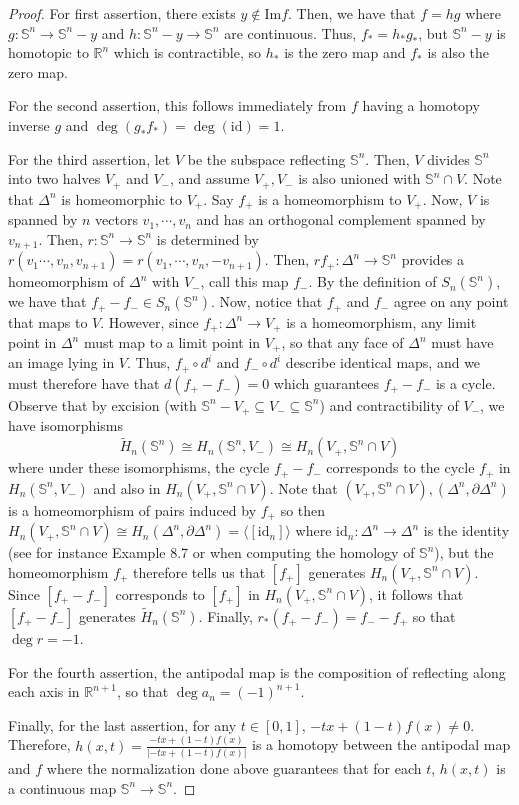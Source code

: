 \documentclass[12pt,reqno]{amsart}
\numberwithin{theorem}{section}
\theoremstyle{definition}
\theoremstyle{remark}
\numberwithin{equation}{section}
\renewcommand{\S}{\mathbb S}
\renewcommand{\Im}{\text{Im}}
\newcommand{\del}{\partial}
\theoremstyle{definition}
\newcommand{\R}{\mathbb{R}}
\newcommand{\id}{\mathrm{id}}
\begin{document}
\begin{proof}
    For first assertion, there exists $y \notin \Im f$. Then, we have that $f = hg$ where $g:\S^n \rightarrow \S^n - y$ and $h:\S^n - y \rightarrow \S^n$ are continuous. Thus, $f_*=h_*g_*$, but $\S^n-y$ is homotopic to $\R^n$ which is contractible, so $h_*$ is the zero map and $f_*$ is also the zero map.

    For the second assertion, this follows immediately from $f$ having a homotopy inverse $g$ and $\deg (g_*f_*) = \deg(\id) = 1$.

    For the third assertion, let $V$ be the subspace reflecting $\S^n$. Then, $V$ divides $\S^n$ into two halves $V_+$ and $V_-$, and assume $V_+,V_-$ is also unioned with $\S^n \cap V$. Note that $\Delta^n$ is homeomorphic to $V_+$. Say $f_+$ is a homeomorphism to $V_+$. Now, $V$ is spanned by $n$ vectors $v_1,\cdots, v_n$ and has an orthogonal complement spanned by $v_{n+1}$. Then, $r:\S^n\rightarrow \S^n$ is determined by $r(v_1\cdots, v_n,v_{n+1}) = r(v_1,\cdots,v_n,-v_{n+1})$. Then, $rf_+ : \Delta^n \rightarrow \S^n$ provides a homeomorphism of $\Delta^n$ with $V_-$, call this map $f_-$. By the definition of $S_n(\S^n)$, we have that $f_+-f_- \in S_n(\S^n)$. Now, notice that $f_+$ and $f_-$ agree on any point that maps to $V$. However, since $f_+:\Delta^n \rightarrow V_+$ is a homeomorphism, any limit point in $\Delta^n$ must map to a limit point in $V_+$, so that any face of $\Delta^n$ must have an image lying in $V$. Thus, $f_+\circ d^i$ and $f_-\circ d^i$ describe identical maps, and we must therefore have that $d(f_+-f_-) = 0$ which guarantees $f_+-f_-$ is a cycle. Observe that by excision (with $\S^n - V_+ \subseteq V_- \subseteq \S^n$) and contractibility of $V_-$, we have isomorphisms 
    $$\tilde H_n(\S^n) \cong H_n(\S^n,V_-) \cong H_n(V_+,\S^n \cap V) $$
    where under these isomorphisms, the cycle $f_+ - f_-$ corresponds to the cycle $f_+$ in $H_n(\S^n,V_-)$ and also in $H_n(V_+,\S^n \cap V)$. Note that $(V_+,\S^n \cap V), (\Delta^n ,\del \Delta^n)$ is a homeomorphism of pairs induced by $f_+$ so then $H_n(V_+,\S^n \cap V) \cong H_n(\Delta^n ,\del \Delta^n) = \langle [\id_n]\rangle $ where $\id_n:\Delta^n \rightarrow \Delta^n$ is the identity (see for instance \cite{miller} Example 8.7 or \cite{hatcher} when computing the homology of $\S^n$), but the homeomorphism $f_+$ therefore tells us that $[f_+]$ generates $H_n(V_+,\S^n \cap V)$. Since $[f_+-f_-]$ corresponds to $[f_+]$ in $H_n(V_+,\S^n \cap V)$, it follows that $[f_+-f_-]$ generates $\tilde H_n(\S^n)$. Finally, $r_*(f_+-f_-) = f_- - f_+$ so that $\deg r = -1$. 

    For the fourth assertion, the antipodal map is the composition of reflecting along each axis in $\R^{n+1}$, so that $\deg a_n = (-1)^{n+1}$.

    Finally, for the last assertion, for any $t \in [0,1]$, $-tx + (1-t)f(x) \neq 0$. Therefore, $h(x,t)=\frac{-tx + (1-t)f(x)}{|-tx + (1-t)f(x)|}$ is a homotopy between the antipodal map and $f$ where the normalization done above guarantees that for each $t$, $h(x,t)$ is a continuous map $\S^n \rightarrow \S^n$.
\end{proof}
\end{document}
